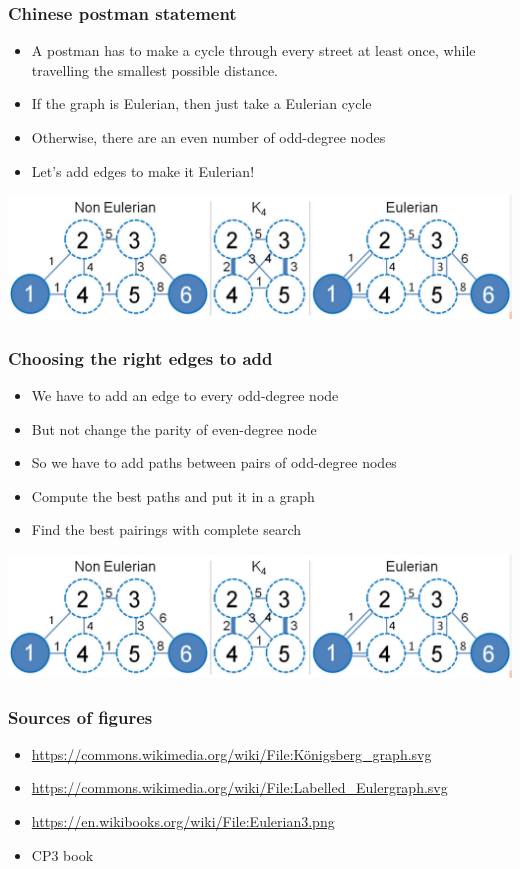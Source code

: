 \documentclass[12pt]{beamer}
\begin{document}
\begin{frame}
\frametitle{Chinese postman statement}
\begin{itemize}
\item A postman has to make a cycle through every street at least once, while travelling the smallest possible distance.
\item If the graph is Eulerian, then just take a Eulerian cycle
\item Otherwise, there are an even number of odd-degree nodes
\item Let's add edges to make it Eulerian!
\end{itemize}
\begin{center}
\includegraphics[width=.9\linewidth]{img/cp3-complete}
\end{center}
\end{frame}

\begin{frame}
\frametitle{Choosing the right edges to add}
\begin{itemize}
\item We have to add an edge to every odd-degree node
\item But not change the parity of even-degree node
\item So we have to add paths between pairs of odd-degree nodes
\item Compute the best paths and put it in a graph
\item Find the best pairings with complete search
\end{itemize}
\begin{center}
\includegraphics[width=.9\linewidth]{img/cp3-complete}
\end{center}
\end{frame}

\begin{frame}
\frametitle{Sources of figures}
\begin{itemize}
\item \url{https://commons.wikimedia.org/wiki/File:Königsberg_graph.svg}
\item \url{https://commons.wikimedia.org/wiki/File:Labelled_Eulergraph.svg}
\item \url{https://en.wikibooks.org/wiki/File:Eulerian3.png}
\item CP3 book
\end{itemize}
\end{frame}
\end{document}
